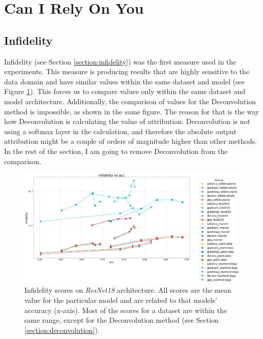 \section{Can I Rely On You}\label{results:can-i-rely}

\subsection{Infidelity}\label{results:infidelity}

Infidelity (see Section \ref{section:infidelity}) was the first measure used in the experiments. This measure is producing results that are highly sensitive to the data domain and have similar values within the same dataset and model (see Figure \ref{fig:resnet-inf}). This forces us to compare values only within the same dataset and model architecture. Additionally, the comparison of values for the Deconvolution method is  impossible, as shown in the same figure. The reason for that is the way how Deconvolution is calculating the value of attribution. Deconvolution is not using a softmax layer in the calculation, and therefore the absolute output attribution might be a couple of orders of magnitude higher than other methods. In the rest of the section, I am going to remove Deconvolution from the comparison.

\begin{figure}[h]
  \centering
    \centering
    \includegraphics[width=\textwidth]{results/metrics/resnet18-infidelity vs acc.png}
    \caption{Infidelity scores on \textit{ResNet18} architecture. All scores are the mean value for the particular model and are related to that models' accuracy (x-axis). Most of the scores for a dataset are within the same range, except for the Deconvolution method (see Section \ref{section:deconvolution}).}\label{fig:resnet-inf}
\end{figure}


